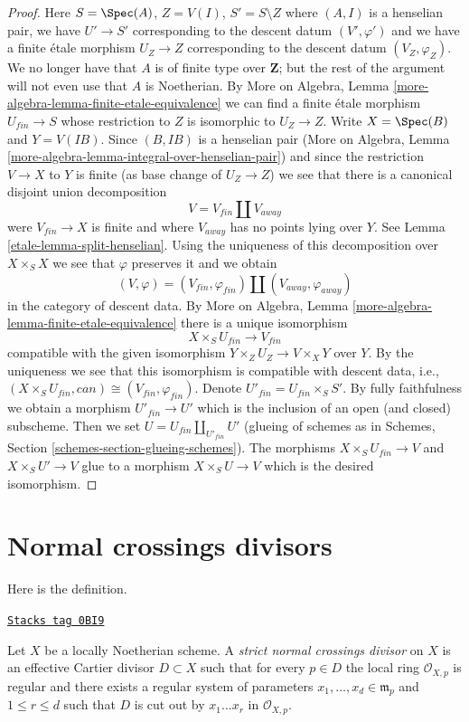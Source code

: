 \begin{proof}
\medskip\noindent
Here $S = \Spec(A)$, $Z = V(I)$, $S' = S \setminus Z$ where
$(A, I)$ is a henselian pair, we have $U' \to S'$ corresponding
to the descent datum $(V', \varphi')$ and we have a finite \'etale
morphism $U_Z \to Z$ corresponding to the descent datum
$(V_Z, \varphi_Z)$. We no longer have that $A$ is of finite type
over $\mathbf{Z}$; but the rest of the argument will not even use
that $A$ is Noetherian.
By More on Algebra, Lemma \ref{more-algebra-lemma-finite-etale-equivalence}
we can find a finite \'etale morphism $U_{fin} \to S$ whose
restriction to $Z$ is isomorphic to $U_Z \to Z$.
Write $X = \Spec(B)$ and $Y = V(IB)$. Since $(B, IB)$ is a henselian pair
(More on Algebra, Lemma \ref{more-algebra-lemma-integral-over-henselian-pair})
and since the restriction $V \to X$ to $Y$
is finite (as base change of $U_Z \to Z$) we see that
there is a canonical disjoint union decomposition
$$
V = V_{fin} \amalg V_{away}
$$
were $V_{fin} \to X$ is finite and where $V_{away}$ has no
points lying over $Y$. See Lemma \ref{etale-lemma-split-henselian}.
Using the uniqueness of this decomposition over $X \times_S X$
we see that $\varphi$ preserves it and we obtain
$$
(V, \varphi) = (V_{fin}, \varphi_{fin}) \amalg (V_{away}, \varphi_{away})
$$
in the category of descent data.
By More on Algebra, Lemma \ref{more-algebra-lemma-finite-etale-equivalence}
there is a unique isomorphism
$$
X \times_S U_{fin} \longrightarrow V_{fin}
$$
compatible with the given isomorphism $Y \times_Z U_Z \to V \times_X Y$
over $Y$.
By the uniqueness we see that this isomorphism is compatible
with descent data, i.e.,
$(X \times_S U_{fin}, can) \cong (V_{fin}, \varphi_{fin})$.
Denote $U'_{fin} = U_{fin} \times_S S'$. By fully faithfulness
we obtain a morphism $U'_{fin} \to U'$ which is
the inclusion of an open (and closed) subscheme.
Then we set $U = U_{fin} \amalg_{U'_{fin}} U'$ (glueing of schemes as
in Schemes, Section \ref{schemes-section-glueing-schemes}).
The morphisms $X \times_S U_{fin} \to V$ and
$X \times_S U' \to V$ glue to a morphism $X \times_S U \to V$
which is the desired isomorphism.
\end{proof}

\section{Normal crossings divisors}
\label{etale-section-normal-crossings}
Here is the definition.

\begin{definition}
\label{etale-definition-strict-normal-crossings}
\href{https://stacks.math.columbia.edu/tag/0BI9}{\texttt{Stacks tag 0BI9}}

Let $X$ be a locally Noetherian scheme. A
{\it strict normal crossings divisor}
on $X$ is an effective Cartier divisor $D \subset X$ such that
for every $p \in D$ the local ring $\mathcal{O}_{X, p}$ is regular
and there exists a regular system of parameters
$x_1, \ldots, x_d \in \mathfrak m_p$ and $1 \leq r \leq d$
such that $D$ is cut out by $x_1 \ldots x_r$ in $\mathcal{O}_{X, p}$.
\end{definition}


